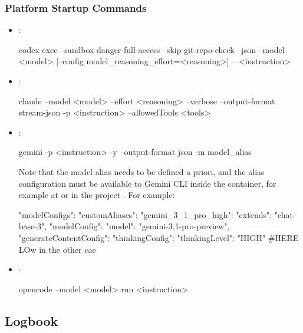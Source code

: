 \documentclass[11pt]{article}
\begin{document}
\subsubsection*{Platform Startup Commands}
  \begin{itemize}
    \item {}:
  \begin{DocCode}
  codex exec --sandbox danger-full-access --skip-git-repo-check --json --model <model>
  [--config model_reasoning_effort=<reasoning>] -- <instruction>
  \end{DocCode}

  \item {}:
  \begin{DocCode}
  claude --model <model> --effort <reasoning> --verbose --output-format stream-json -p <instruction> --allowedTools <tools>
  \end{DocCode}

    \item {}:
  \begin{DocCode}
  gemini -p <instruction> -y --output-format json -m {model_alias}
  \end{DocCode}
  Note that the model alias needs to be defined a priori, and the alias configuration
  must be available to Gemini CLI inside the container, for example at
   or in the project
  . For example:
  \begin{DocCode}
      {
    "modelConfigs": {
      "customAliases": {
        "gemini_3_1_pro_high": {
          "extends": "chat-base-3",
          "modelConfig": {
            "model": "gemini-3.1-pro-preview",
            "generateContentConfig": {
              "thinkingConfig": {
                "thinkingLevel": "HIGH" #HERE LOw in the other cae
              }
            }
          }
        }
      }
    }
  }
  \end{DocCode}
    \item {}:
  \begin{DocCode}
  opencode --model <model> run <instruction>
  \end{DocCode}
  \end{itemize}

\subsection*{Logbook}
\end{document}
